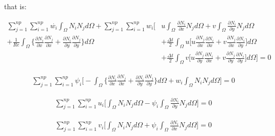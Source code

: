 \noindent
that is:

\begin{equation} \label{vorticity pre matrix}
 \begin{aligned} 
  \sum\limits_{j=1}^{np} 
  \sum\limits_{i=1}^{np} \overset{.}{w_i} \int_{\Omega} N_i N_j d\Omega 
  + \sum\limits_{j=1}^{np} 
    \sum\limits_{i=1}^{np} w_i \Bigg[
  & u \int_{\Omega}  \frac{\partial N_i}{\partial x} N_j d\Omega 
  + v \int_{\Omega} \frac{\partial N_i}{\partial y} N_j d\Omega
  \\[5pt]
  + \frac{1}{\textit{Re}} \int_{\Omega} \Bigg\{ 
                    \frac{\partial N_i}{\partial x} 
                    \frac{\partial N_j}{\partial x} 
  +                 \frac{\partial N_i}{\partial y} 
                    \frac{\partial N_j}{\partial y} 
  \Bigg\} d\Omega 
 & + \frac{\Delta t}{2} \int_{\Omega} u
 \Bigg[
   u \frac{\partial N_j}{\partial x} \frac{\partial N_i}{\partial x}
 + v \frac{\partial N_j}{\partial x} \frac{\partial N_i}{\partial y}
 \Bigg] d\Omega
 \\[5pt]
 & + \frac{\Delta t}{2} \int_{\Omega} v
 \Bigg[
   u \frac{\partial N_j}{\partial y} \frac{\partial N_i}{\partial x}
 + v \frac{\partial N_j}{\partial y} \frac{\partial N_i}{\partial y}
 \Bigg] d\Omega
  \Bigg] = 0
 \end{aligned}
\end{equation}

\begin{equation}
 \begin{aligned}
  \sum\limits_{j=1}^{np}
  \sum\limits_{i=1}^{np} \psi_i \Bigg[
  - \int_{\Omega} \Bigg\{ 
                  \frac{\partial N_i}{\partial x} 
                  \frac{\partial N_j}{\partial x} 
  +               \frac{\partial N_i}{\partial y} 
                  \frac{\partial N_j}{\partial y} 
  \Bigg\} d\Omega
  + w_i \int_{\Omega} N_i N_j d\Omega
  \Bigg] = 0
 \end{aligned}
\end{equation}

\begin{equation}
 \begin{aligned}
  \sum\limits_{j=1}^{np}
  \sum\limits_{i=1}^{np} u_i \Bigg[
   \int_{\Omega} N_i N_j d\Omega
 - \psi_i \int_{\Omega} \frac{\partial N_i}{\partial y} N_j d\Omega
  \Bigg] = 0
 \end{aligned}
\end{equation}

\begin{equation}
 \begin{aligned}
  \sum\limits_{j=1}^{np}
  \sum\limits_{i=1}^{np} v_i \Bigg[
   \int_{\Omega} N_i N_j d\Omega
 + \psi_i \int_{\Omega} \frac{\partial N_i}{\partial x} N_j d\Omega
  \Bigg] = 0
 \end{aligned}
\end{equation}

